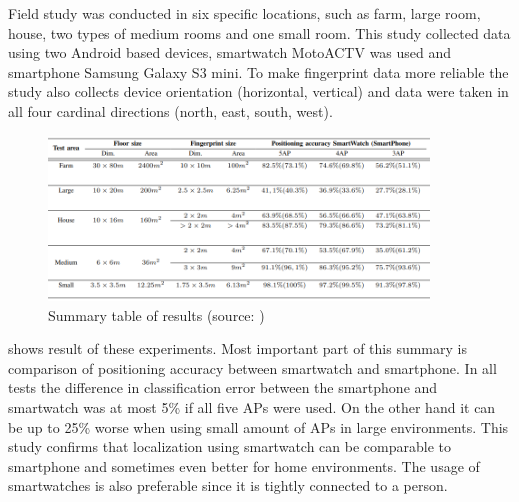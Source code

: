 Field study was conducted in six specific locations, such as farm, large room, house, two types of medium rooms and one small room. This study collected data using two Android based devices, smartwatch MotoACTV was used and smartphone Samsung Galaxy S3 mini. To make fingerprint data more reliable the study also collects device orientation (horizontal, vertical) and data were taken in all four cardinal directions (north, east, south, west).

\begin{figure}[H]
	\begin{centering}
		\includegraphics[width=0.9\textwidth]{img/smartwatch_vs_smartphone}
		\par\end{centering}
	\caption{Summary table of results (source: \cite{SWvsSP})\label{fig:SWvsSP}}
	\label{fig02c03}
\end{figure}

 shows result of these experiments. Most important part of this summary is comparison of positioning accuracy between smartwatch and smartphone. In all tests the difference in classification error between the smartphone and smartwatch was at most 5\% if all five APs were used. On the other hand it can be up to 25\% worse when using small amount of APs in large environments. This study confirms that localization using smartwatch can  be comparable to smartphone and sometimes even better for home environments. The usage of smartwatches is also preferable since it is tightly connected to a person.
